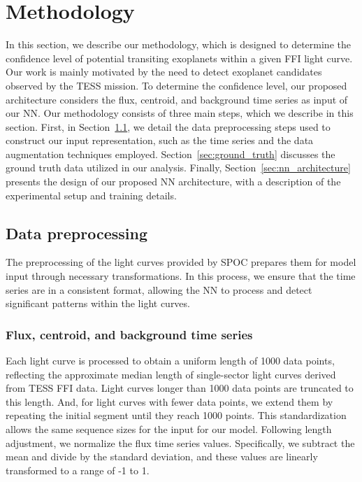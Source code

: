 
\section{Methodology}
\label{sec:ourmethod}

In this section, we describe our methodology, which is designed to determine the confidence level of potential transiting exoplanets within a given FFI light curve. Our work is mainly motivated by the need to detect exoplanet candidates observed by the TESS mission. To determine the confidence level, our proposed architecture considers the flux, centroid, and background time series as input of our NN. Our methodology consists of three main steps, which we describe in this section. First, in Section~\ref{sec:preprocessing}, we detail the data preprocessing steps used to construct our input representation, such as the time series and the data augmentation techniques employed. Section~\ref{sec:ground_truth} discusses the ground truth data utilized in our analysis. Finally, Section~\ref{sec:nn_architecture} presents the design of our proposed NN architecture, with a description of the experimental setup and training details.

\subsection{Data preprocessing}
\label{sec:preprocessing}
The preprocessing of the light curves provided by SPOC prepares them for model input through necessary transformations. In this process, we ensure that the time series are in a consistent format, allowing the NN to process and detect significant patterns within the light curves. \par


\subsubsection{Flux, centroid, and background time series}

Each light curve is processed to obtain a uniform length of 1000 data points, reflecting the approximate median length of single-sector light curves derived from TESS FFI data. Light curves longer than 1000 data points are truncated to this length. And, for light curves with fewer data points, we extend them by repeating the initial segment until they reach 1000 points. This standardization allows the same sequence sizes for the input for our model. Following length adjustment, we normalize the flux time series values. Specifically, we subtract the mean and divide by the standard deviation, and these values are linearly transformed to a range of -1 to 1. \par
 


